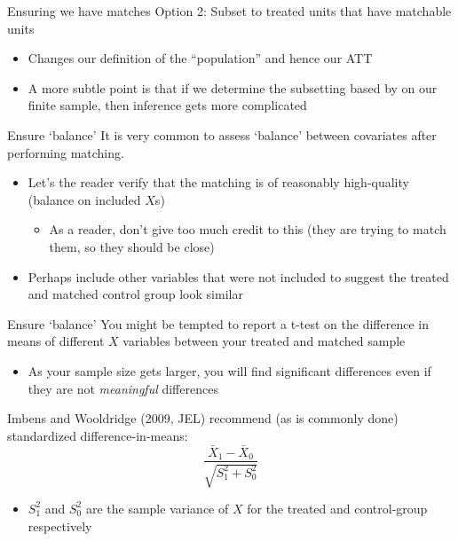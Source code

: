 \documentclass[aspectratio=169,t,11pt,table]{beamer}
\begin{document}
\begin{frame}{Ensuring we have matches}
  Option 2: Subset to treated units that have matchable units
  \begin{itemize}
    \item Changes our definition of the ``population'' and hence our ATT
    
    \item A more subtle point is that if we determine the subsetting based by on our finite sample, then inference gets more complicated
  \end{itemize}
\end{frame}

\begin{frame}{Ensure `balance'}
  It is very common to assess `balance' between covariates after performing matching. 
  \begin{itemize}
    \item Let's the reader verify that the matching is of reasonably high-quality (balance on included $X$s)
    \begin{itemize}
      \item As a reader, don't give too much credit to this (they are trying to match them, so they should be close)
    \end{itemize}
    
    \item Perhaps include other variables that were not included to suggest the treated and matched control group look similar
  \end{itemize}
\end{frame}

\begin{frame}{Ensure `balance'}
  You might be tempted to report a t-test on the difference in means of different $X$ variables between your treated and matched sample
  \begin{itemize}
    \item As your sample size gets larger, you will find significant differences even if they are not \emph{meaningful} differences
  \end{itemize}
  
  \bigskip
  Imbens and Wooldridge (2009, JEL) recommend (as is commonly done) standardized difference-in-means:
  $$
    \frac{\bar{X}_1 - \bar{X}_0}{\sqrt{S_1^2 + S_0^2}}
  $$
  \begin{itemize}
    \item $S_1^2$ and $S_0^2$ are the sample variance of $X$ for the treated and control-group respectively 
  \end{itemize}
\end{frame}
\end{document}

